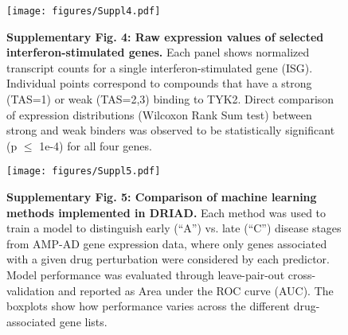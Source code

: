 \documentclass{article}
\begin{document}

\begin{figure}
  \begin{center}
    \texttt{[image: figures/Suppl4.pdf]}
  \end{center}
  \caption*{\textbf{Supplementary Fig. 4: Raw expression values of selected interferon-stimulated genes.} Each panel shows normalized transcript counts for a single interferon-stimulated gene (ISG). Individual points correspond to compounds that have a strong (TAS=1) or weak (TAS=2,3) binding to TYK2. Direct comparison of expression distributions (Wilcoxon Rank Sum test) between strong and weak binders was observed to be statistically significant (p $\leq$ 1e-4) for all four genes.}
\end{figure}

\begin{figure}
  \begin{center}
    \texttt{[image: figures/Suppl5.pdf]}
  \end{center}
  \caption*{\textbf{Supplementary Fig. 5: Comparison of machine learning methods implemented in DRIAD.} Each method was used to train a model to distinguish early (“A”) vs. late (“C”) disease stages from AMP-AD gene expression data, where only genes associated with a given drug perturbation were considered by each predictor. Model performance was evaluated through leave-pair-out cross-validation and reported as Area under the ROC curve (AUC). The boxplots show how performance varies across the different drug-associated gene lists.}
\end{figure}
\end{document}

